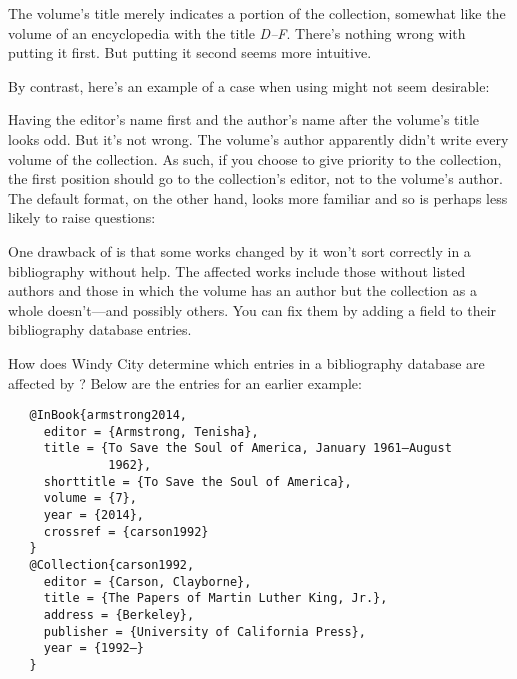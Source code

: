 \documentclass[11pt,letterpaper,oneside]{article}
\begin{document}
\noindent The volume's title merely indicates a portion of the
collection, somewhat like the volume of an encyclopedia with the title
\textit{D–F}. There's nothing wrong with putting it first. But putting
it second seems more intuitive.

By contrast, here's an example of a case when using 
might not seem desirable:

\begin{citebib}
\item \cite{barrows1959}
\end{citebib}

\noindent Having the editor's name first and the author's name after
the volume's title looks odd. But it's not wrong. The volume's author
apparently didn't write every volume of the collection. As such, if
you choose to give priority to the collection, the first position
should go to the collection's editor, not to the volume's author. The
default format, on the other hand, looks more familiar and so is
perhaps less likely to raise questions:

\begin{citebib}
\item \cite{barrows1959}
\end{citebib}

One drawback of  is that some works changed by it won't
sort correctly in a bibliography without help. The affected works
include those without listed authors and those in which the volume has
an author but the collection as a whole doesn't---and possibly others.
You can fix them by adding a  field to their
bibliography database entries.

How does Windy City determine which entries in a bibliography database
are affected by ? Below are the entries for an earlier
example:

\begin{verbatim}
   @InBook{armstrong2014,
     editor = {Armstrong, Tenisha},
     title = {To Save the Soul of America, January 1961–August
              1962},
     shorttitle = {To Save the Soul of America},
     volume = {7},
     year = {2014},
     crossref = {carson1992}
   }
   @Collection{carson1992,
     editor = {Carson, Clayborne},
     title = {The Papers of Martin Luther King, Jr.},
     address = {Berkeley},
     publisher = {University of California Press},
     year = {1992–}
   }
\end{verbatim}
\end{document}
